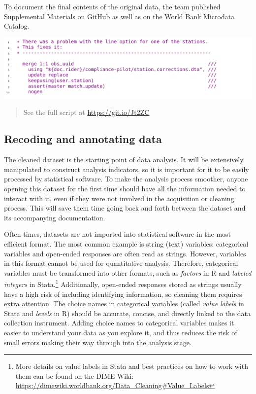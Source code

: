 \documentclass[
]{book}
\begin{document}
\begin{ex}
To document the final contents of the original data, the team published Supplemental Materials on GitHub as well as on the World Bank Microdata Catalog.

\includegraphics{examples/ch5-correcting-data-points.png}

\begin{quote}
See the full script at \url{https://git.io/Jt2ZC}
\end{quote}
\end{ex}

\hypertarget{recoding-and-annotating-data}{%
\subsection*{Recoding and annotating data}\label{recoding-and-annotating-data}}

The cleaned dataset is the starting point of data analysis.
It will be extensively manipulated to construct analysis indicators,
so it is important for it to be easily processed by statistical software.
To make the analysis process smoother,
anyone opening this dataset for the first time should have all the information needed to interact with it,
even if they were not involved in the acquisition or cleaning process.
This will save them time going back and forth between the dataset and its accompanying documentation.

Often times, datasets are not imported into statistical software in the most efficient format.
The most common example is string (text) variables:
categorical variables and open-ended responses are often read as strings.
However, variables in this format cannot be used for quantitative analysis.
Therefore, categorical variables must be transformed into other formats,
such as \emph{factors} in R and \emph{labeled integers} in Stata.\footnote{More details on value labels in Stata
  and best practices on how to work with them
  can be found on the DIME Wiki:
  \url{https://dimewiki.worldbank.org/Data_Cleaning\#Value_Labels}}
Additionally, open-ended responses stored as strings usually have a high risk of including identifying information,
so cleaning them requires extra attention.
The choice names in categorical variables
(called \emph{value labels} in Stata and \emph{levels} in R)
should be accurate, concise,
and directly linked to the data collection instrument.
Adding choice names to categorical variables
makes it easier to understand your data as you explore it,
and thus reduces the risk of small errors making their way through into the analysis stage.
\end{document}
